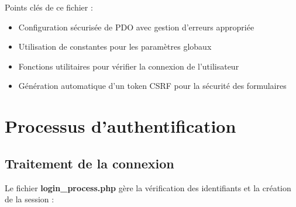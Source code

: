 \documentclass[12pt,a4paper]{report}
\begin{document}
Points clés de ce fichier :
\begin{itemize}
    \item Configuration sécurisée de PDO avec gestion d'erreurs appropriée
    \item Utilisation de constantes pour les paramètres globaux
    \item Fonctions utilitaires pour vérifier la connexion de l'utilisateur
    \item Génération automatique d'un token CSRF pour la sécurité des formulaires
\end{itemize}

\section{Processus d'authentification}

\subsection{Traitement de la connexion}
Le fichier \textbf{login\_process.php} gère la vérification des identifiants et la création de la session :
\end{document}
